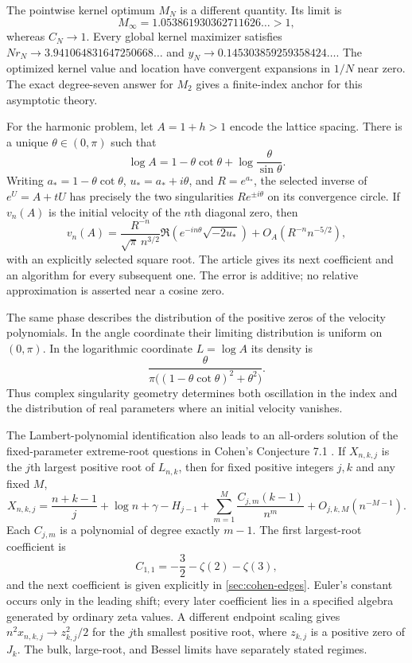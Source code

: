 \documentclass[11pt]{article}
\numberwithin{equation}{section}
\theoremstyle{definition}
\theoremstyle{remark}
\begin{document}
The pointwise kernel optimum $M_N$ is a different quantity. Its limit is
\[
 M_\infty=1.053861930362711626\ldots>1,
\]
whereas $C_N\to1$. Every global kernel maximizer satisfies
$Nr_N\to3.941064831647250668\ldots$ and
$y_N\to0.145303859259358424\ldots$. The optimized kernel value and
location have convergent expansions in $1/N$ near zero. The exact
degree-seven answer for $M_2$ gives a finite-index anchor for this
asymptotic theory.

For the harmonic problem, let $A=1+h>1$ encode the lattice spacing.
There is a unique $\theta\in(0,\pi)$ such that
\begin{equation}\label{eq:intro-angle}
 \log A=1-\theta\cot\theta+\log\frac\theta{\sin\theta}.
\end{equation}
Writing $a_*=1-\theta\cot\theta$, $u_*=a_*+i\theta$, and
$R=e^{a_*}$, the selected inverse of $e^U=A+tU$ has precisely the
two singularities $Re^{\pm i\theta}$ on its convergence circle.
If $v_n(A)$ is the initial velocity of the $n$th diagonal zero, then
\[
 v_n(A)=\frac{R^{-n}}{\sqrt\pi\,n^{3/2}}
          \Re\!\left(e^{-in\theta}\sqrt{-2u_*}\right)
          +O_A(R^{-n}n^{-5/2}),
\]
with an explicitly selected square root. The article gives its next
coefficient and an algorithm for every subsequent one. The error is
additive; no relative approximation is asserted near a cosine zero.

The same phase describes the distribution of the positive zeros of
the velocity polynomials. In the angle coordinate their limiting
distribution is uniform on $(0,\pi)$. In the logarithmic coordinate
$L=\log A$ its density is
\[
 \frac{\theta}{\pi\bigl((1-\theta\cot\theta)^2+\theta^2\bigr)}.
\]
Thus complex singularity geometry determines both oscillation in the
index and the distribution of real parameters where an initial
velocity vanishes.

The Lambert-polynomial identification also leads to an all-orders
solution of the fixed-parameter extreme-root questions in Cohen's
Conjecture 7.1 \cite{Cohen2021}. If $X_{n,k,j}$ is the $j$th largest
positive root of $L_{n,k}$, then for fixed positive integers $j,k$ and
any fixed $M$,
\begin{equation}\label{eq:intro-Cohen}
 X_{n,k,j}=\frac{n+k-1}{j}+\log n+\gamma-H_{j-1}
       +\sum_{m=1}^{M}\frac{C_{j,m}(k-1)}{n^m}
       +O_{j,k,M}(n^{-M-1}).
\end{equation}
Each $C_{j,m}$ is a polynomial of degree exactly $m-1$. The first
largest-root coefficient is
\[
 C_{1,1}=-\frac32-\zeta(2)-\zeta(3),
\]
and the next coefficient is given explicitly in
\cref{sec:cohen-edges}. Euler's constant occurs only in the leading
shift; every later coefficient lies in a specified algebra generated
by ordinary zeta values. A different endpoint scaling gives
$n^2x_{n,k,j}\to z_{k,j}^2/2$ for the $j$th smallest positive root,
where $z_{k,j}$ is a positive zero of $J_k$. The bulk, large-root,
and Bessel limits have separately stated regimes.
\end{document}
